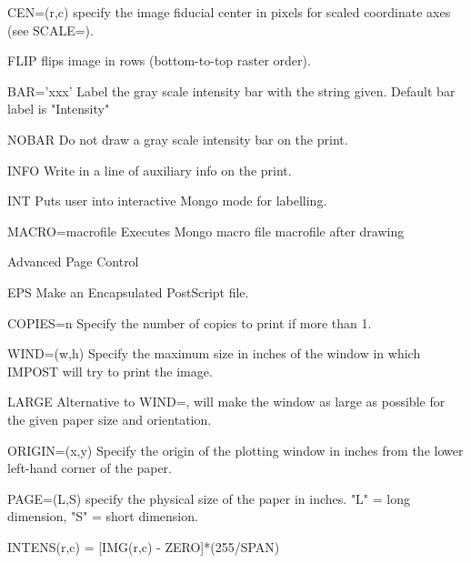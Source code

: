 {\begin{command}
  \item[CEN=(r,c)]{specify the image fiducial center in pixels for
                  scaled coordinate axes (see SCALE=).}
  \item[FLIP ]{flips image in rows (bottom-to-top raster order).}
  \item[BAR='xxx' ]{Label the gray scale intensity bar with the string
                    given.  Default bar label is "Intensity"}
  \item[NOBAR ]{Do not draw a gray scale intensity bar on the print.}
  \item[INFO ]{Write in a line of auxiliary info on the print.}
  \item[INT  ]{Puts user into interactive Mongo mode for labelling.}
  \item[MACRO=macrofile]{ Executes Mongo macro file macrofile after drawing}
  \item[Advanced Page Control\hfill]{}
  \item[EPS]{Make an Encapsulated PostScript file.}
  \item[COPIES=n ]{Specify the number of copies to print if more than 1.}
  \item[WIND=(w,h)]{Specify the maximum size in inches of the window in 
                    which IMPOST will try to print the image.}
  \item[LARGE ]{Alternative to WIND=, will make the window as large as 
                possible for the given paper size and orientation.}
  \item[ORIGIN=(x,y)]{Specify the origin of the plotting window in inches 
                      from the lower left-hand corner of the paper.}
  \item[PAGE=(L,S) ]{specify the physical size of the paper in inches.
                     "L" = long dimension, "S" = short dimension.}
\end{command}%
\lthtmlfigureZ
\lthtmlcheckvsize\clearpage}

{\newpage\clearpage
{}%
\begin{hanging}
  \item{          INTENS(r,c) = {[IMG(r,c) - ZERO]}*(255/SPAN)}
\end{hanging}%
\lthtmlfigureZ
\lthtmlcheckvsize\clearpage}

